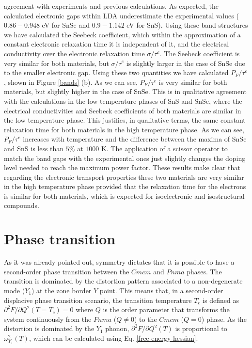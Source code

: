 agreement with experiments\cite{vidal2012band,zhao2014ultralow} and previous calculations\cite{guo2015first}. As expected, the calculated electronic gaps within LDA underestimate the experimental values ($0.86-0.948$ eV for SnSe
and $0.9-1.142$ eV for SnS). Using these band structures we have calculated the Seebeck coefficient, which within the approximation of a constant electronic relaxation time it is independent of it, and the electrical conductivity 
over the electronic relaxation time $\sigma/\tau^{e}$. The Seebeck coefficient is very similar for both materials, but $\sigma/\tau^{e}$ is slightly larger in the case of SnSe due to the smaller electronic gap. Using these two
quantities we have calculated  $P_{F}/\tau^{e}$, shown in Figure \ref{bands} (b). As we can see, $P_{F}/\tau^{e}$ is very similar for both materials, but slightly higher in the case of SnSe.
This is in qualitative agreement with the calculations in the low temperature phases of SnS and SnSe\cite{guo2015first}, where the electrical conductivities and Seebeck coefficients of both materials are similar
in the low temperature phase. This justifies, in qualitative terms, the same constant relaxation time for both materials in the high temperature phase. As we can see,  $P_{F}/\tau^{e}$ increases with temperature and the
difference between the maxima of SnSe and SnS is less than $5\%$ at $1000$ K. The application of a scissor operator to match the band gaps with the experimental ones just slightly changes the doping level needed to reach the
maximum power factor.
These results make clear that regarding the electronic transport properties these two materials are very similar in the high temperature phase provided that the relaxation time for the electrons is similar for both
materials, which is expected for isoelectronic and isostructural compounds.

\section{Phase transition}

As it was already pointed out\cite{chattopadhyay1986neutron,aseginolaza2019phonon}, symmetry\cite{orobengoa2009amplimodes,perez2010mode} dictates that it is possible to have a second-order phase transition between
the $Cmcm$ and $Pnma$ phases. The transition is dominated by the distortion pattern associated to a non-degenerate mode ($Y_{1}$) at the zone border $Y$ point. This means\cite{aseginolaza2019phonon} that, in a second-order
displacive phase transition scenario, the transition temperature $T_{c}$ is defined as $\partial^{2}F/\partial Q^{2}(T=T_{c})=0$ where $Q$ is the order parameter that transforms the system continuously from the $Pnma$ ($Q\ne0$) to
the $Cmcm$ ($Q=0$) phase. As the distortion is dominated by the $Y_{1}$ phonon,  $\partial^{2}F/\partial Q^{2}(T)$ is proportional to $\omega_{Y_{1}}^{2}(T)$, which can be calculated using Eq. \ref{free-energy-hessian}. \\

